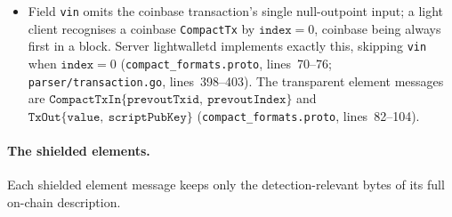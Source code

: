 \documentclass[11pt,a4paper]{article}
\theoremstyle{definition}
\begin{document}
\begin{itemize}
  provide'', but neither deployed server populates it:
  \textsf{lightwalletd} leaves it commented out with \texttt{TODO:
  calculate fees} (\texttt{parser/transaction.go}, line~407) and
  \textsf{Zaino} hardcodes \texttt{fee: 0} (\texttt{zaino-fetch},
  \texttt{src/chain/transaction.rs}, line~369).
  Clients cannot rely on it. For a transaction with no transparent inputs
  the proto comment gives the client-side reconstruction
  (\texttt{compact\_formats.proto}, lines~59--64):
  \[
  \mathrm{fee} \;=\; \mathrm{valueBalanceSapling}
    + \mathrm{valueBalanceOrchard}
    + \textstyle\sum \mathrm{vPubNew}
    - \sum \mathrm{vPubOld}
    - \sum \mathrm{tOut},
  \]
  with $\mathrm{valueBalanceIronwood}$ joining the sum in
  v0.5.0.\footnote{Type \texttt{uint32} additionally caps the representable
  fee at $2^{32}-1$ zatoshi ($\approx 42.9$~ZEC); the proto comment does not
  remark on this.}
\item Field \texttt{vin} omits the coinbase transaction's single
  null-outpoint input; a light client recognises a coinbase
  \texttt{CompactTx} by $\texttt{index} = 0$, coinbase being always first in
  a block. Server \textsf{lightwalletd} implements exactly this, skipping
  \texttt{vin} when $\texttt{index} = 0$ (\texttt{compact\_formats.proto},
  lines~70--76; \texttt{parser/transaction.go}, lines~398--403). The
  transparent element messages are
  $\texttt{CompactTxIn}\{\texttt{prevoutTxid},\ \texttt{prevoutIndex}\}$ and
  $\texttt{TxOut}\{\texttt{value},\ \texttt{scriptPubKey}\}$
  (\texttt{compact\_formats.proto}, lines~82--104).
\end{itemize}

\paragraph{The shielded elements.} Each shielded element message keeps only
the detection-relevant bytes of its full on-chain description.
\end{document}
